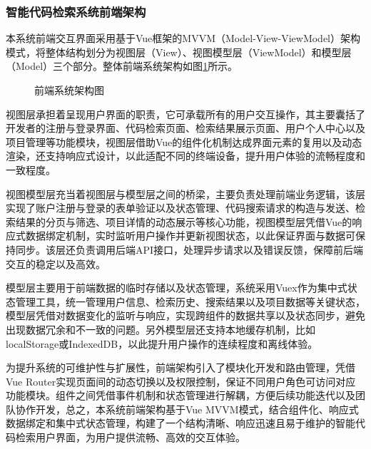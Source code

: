 \documentclass[UTF8,a4paper,12pt]{ctexart}
\numberwithin{equation}{section}
\begin{document}
\subsubsection{智能代码检索系统前端架构}
本系统前端交互界面采用基于Vue框架的MVVM（Model-View-ViewModel）架构模式，将整体结构划分为视图层（View）、视图模型层（ViewModel）和模型层（Model）三个部分。整体前端系统架构如图\ref{front_model}所示。
\begin{figure}[H]
	\caption{前端系统架构图}
	\label{front_model}
\end{figure}

视图层承担着呈现用户界面的职责，它可承载所有的用户交互操作，其主要囊括了开发者的注册与登录界面、代码检索页面、检索结果展示页面、用户个人中心以及项目管理等功能模块，视图层借助Vue的组件化机制达成界面元素的复用以及动态渲染，还支持响应式设计，以此适配不同的终端设备，提升用户体验的流畅程度和一致程度。\par
视图模型层充当着视图层与模型层之间的桥梁，主要负责处理前端业务逻辑，该层实现了账户注册与登录的表单验证以及状态管理、代码搜索请求的构造与发送、检索结果的分页与筛选、项目详情的动态展示等核心功能，视图模型层凭借Vue的响应式数据绑定机制，实时监听用户操作并更新视图状态，以此保证界面与数据可保持同步。该层还负责调用后端API接口，处理异步请求以及错误反馈，保障前后端交互的稳定以及高效。\par
模型层主要用于前端数据的临时存储以及状态管理，系统采用Vuex作为集中式状态管理工具，统一管理用户信息、检索历史、搜索结果以及项目数据等关键状态，模型层凭借对数据变化的监听与响应，实现跨组件的数据共享以及状态同步，避免出现数据冗余和不一致的问题。另外模型层还支持本地缓存机制，比如localStorage或IndexedDB，以此提升用户操作的连续程度和离线体验。\par
为提升系统的可维护性与扩展性，前端架构引入了模块化开发和路由管理，凭借Vue Router实现页面间的动态切换以及权限控制，保证不同用户角色可访问对应功能模块。组件之间凭借事件机制和状态管理进行解耦，方便后续功能迭代以及团队协作开发，总之，本系统前端架构基于Vue MVVM模式，结合组件化、响应式数据绑定和集中式状态管理，构建了一个结构清晰、响应迅速且易于维护的智能代码检索用户界面，为用户提供流畅、高效的交互体验。\par
\end{document}
